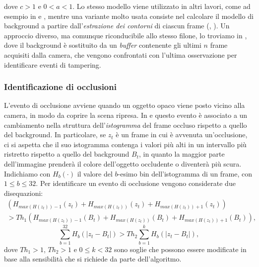   dove $c > 1$ e $0<a<1$.
  Lo stesso modello viene utilizzato in altri lavori, come ad esempio in \cite{saglam2009real} e \cite{tsesmelis2013tamper}, mentre una variante molto usata consiste nel calcolare il modello di background a partire dall'\textit{estrazione dei contorni} di ciascun frame (\cite{harasse2004automated}, \cite{gil2007automatic}).
  Un approccio diverso, ma comunque riconducibile allo stesso filone, lo troviamo in \cite{ribnick2006real}, dove il background \`e sostituito da un \textit{buffer} contenente gli ultimi $n$ frame acquisiti dalla camera, che vengono confrontati con l'ultima osservazione per identificare eventi di tampering.
\subsubsection{Identificazione di occlusioni}
L'evento di occlusione avviene quando un oggetto opaco viene posto vicino alla camera, in modo da coprire la scena ripresa.
In \cite{aksay2007camera} e \cite{saglam2009real} questo evento \`e associato a un cambiamento nella struttura dell'\textit{istogramma} del frame occluso rispetto a quello del background.
In particolare, se $z_t$ \`e un frame in cui \`e avvenuta un'occlusione, ci si aspetta che il suo istogramma contenga i valori pi\`u alti in un intervallo pi\`u ristretto rispetto a quello del background $B_t$, in quanto la maggior parte dell'immagine prender\`a il colore dell'oggetto occludente o diventer\`a pi\`u scura.\\
Indichiamo con $H_b(\cdot)$ il valore del $b$-esimo bin dell'istogramma di un frame, con $1 \leq b \leq 32$.
Per identificare un evento di occlusione vengono considerate due disequazioni:
\begin{eqnarray}
 \left(H_{max\left(H(z_t)\right)-1}(z_t) + H_{max\left(H(z_t)\right)}(z_t) +  H_{max\left(H(z_t)\right) + 1}(z_t)\right) \nonumber \\
 > Th_1 \left(H_{max\left(H(z_t)\right)-1}(B_t) + H_{max\left(H(z_t)\right)}(B_t)
  +  H_{max\left(H(z_t)\right) + 1}(B_t)\right), \nonumber
\end{eqnarray}
\[ \sum_{b=1}^{32} H_b\left(|z_t - B_t|\right) > Th_2 \sum_{b=1}^{k}H_b\left(|z_t - B_t|\right),\]
dove $Th_1 > 1$, $Th_2 > 1$ e $0 \leq k < 32$ sono soglie che possono essere modificate in base alla sensibilit\`a che si richiede da parte dell'algoritmo.\\
